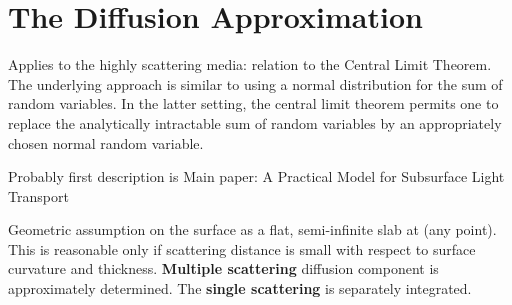 \section{The Diffusion Approximation}
Applies to the highly scattering media: relation to the Central Limit Theorem.
The underlying approach is similar to using a normal distribution for the sum of random variables.
In the latter setting, the central limit theorem permits one to replace the analytically intractable
sum of random variables by an appropriately chosen normal random variable.

Probably first description is \cite{Stam1995}
Main paper: A Practical Model for Subsurface Light Transport \cite{Jensen:2001:PMS:383259.383319}

Geometric assumption on the surface as a flat, semi-infinite slab at (any point). This is reasonable
only if scattering distance is small with respect to surface curvature and thickness.
\textbf{Multiple scattering} diffusion component is approximately determined. The \textbf{single
scattering} is separately integrated.